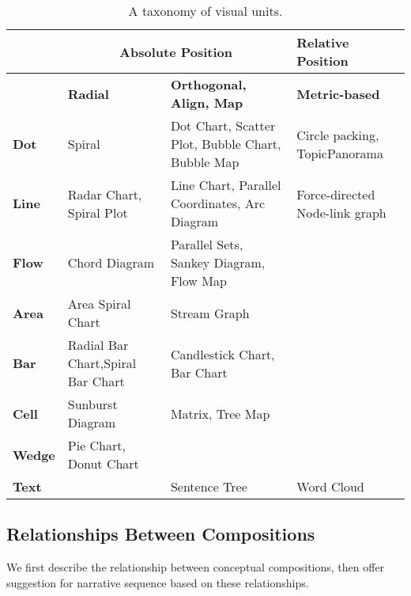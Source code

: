 \begin{table}[tb]
  \caption{A taxonomy of visual units.}
  \label{tab:unit}
  \small
  \centering
  \begin{tabular}{p{1.2cm}|p{1.6cm}|p{1.6cm}|p{1.6cm}}
  \toprule
  \textbf{} &\multicolumn{2}{|c|}{\textbf{Absolute Position}} &\textbf{Relative Position}   \\ 
  \midrule
 \textbf{} &\textbf{Radial} &\textbf{Orthogonal, Align, Map} &\textbf{Metric-based}   \\ 
  \midrule
  \textbf{Dot} &Spiral&Dot Chart, Scatter Plot, Bubble Chart, Bubble Map &Circle packing, TopicPanorama\cite{7042494}\\
  \midrule
  \textbf{Line}&  Radar Chart, Spiral Plot    &Line Chart, Parallel Coordinates, Arc Diagram &  Force-directed Node-link graph   \\ 
  \midrule
   \textbf{Flow}&  Chord Diagram   &Parallel Sets, Sankey Diagram, 
   Flow Map  & \\
  \midrule
  \textbf{Area}&  Area Spiral Chart &Stream Graph &  \\ 
  \midrule
  \textbf{Bar}&      Radial Bar Chart,Spiral Bar Chart  & Candlestick Chart, Bar Chart  &   \\
  \midrule
  \textbf{Cell}& Sunburst Diagram  &Matrix, Tree Map &  \\
  \midrule
  \textbf{Wedge}& Pie Chart, Donut Chart &  &  \\
  \midrule
  \textbf{Text}&    &  Sentence Tree  & Word Cloud \\
  \bottomrule
  
  \end{tabular}
  \vspace{1mm}
\end{table}

\subsection{Relationships Between Compositions}
We first describe the relationship between conceptual compositions, then offer suggestion for narrative sequence based on these relationships. 

